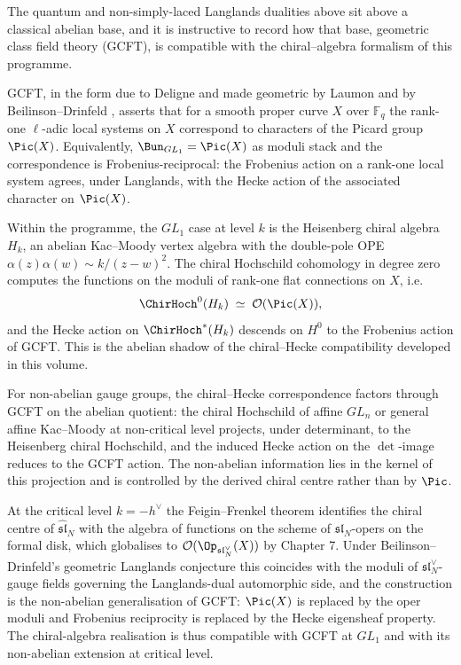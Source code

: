 \begin{remark}
\label{rem:gcft-chiral-compatibility}
The quantum and non-simply-laced Langlands dualities above sit above
a classical abelian base, and it is instructive to record how that
base, geometric class field theory (GCFT), is compatible with the
chiral--algebra formalism of this programme.

GCFT, in the form due to Deligne and made geometric by Laumon
\cite{Laumon90} and by Beilinson--Drinfeld \cite{BD04}, asserts that
for a smooth proper curve $X$ over $\mathbb{F}_q$ the rank-one
$\ell$-adic local systems on $X$ correspond to characters of the
Picard group $\Pic(X)$. Equivalently, $\Bun_{GL_1} = \Pic(X)$ as
moduli stack and the correspondence is Frobenius-reciprocal: the
Frobenius action on a rank-one local system agrees, under Langlands,
with the Hecke action of the associated character on $\Pic(X)$.

Within the programme, the $GL_1$ case at level $k$ is the Heisenberg
chiral algebra $H_k$, an abelian Kac--Moody vertex algebra with the
double-pole OPE $\alpha(z)\alpha(w)\sim k/(z-w)^2$. The chiral
Hochschild cohomology in degree zero computes the functions on the
moduli of rank-one flat connections on $X$, i.e.
\[
 \ChirHoch^0(H_k) \;\simeq\; \mathcal{O}(\Pic(X)),
\]
and the Hecke action on $\ChirHoch^*(H_k)$ descends on $H^0$ to the
Frobenius action of GCFT. This is the abelian shadow of the
chiral--Hecke compatibility developed in this volume.

For non-abelian gauge groups, the chiral--Hecke correspondence factors
through GCFT on the abelian quotient: the chiral Hochschild of affine
$GL_n$ or general affine Kac--Moody at non-critical level projects,
under determinant, to the Heisenberg chiral Hochschild, and the
induced Hecke action on the $\det$-image reduces to the GCFT action.
The non-abelian information lies in the kernel of this projection and
is controlled by the derived chiral centre rather than by $\Pic$.

At the critical level $k = -h^{\vee}$ the Feigin--Frenkel theorem
identifies the chiral centre of $\widehat{\mathfrak{sl}}_N$ with the
algebra of functions on the scheme of $\mathfrak{sl}_N$-opers on the
formal disk, which globalises to $\mathcal{O}(\Op_{\mathfrak{sl}_N^{\vee}}(X))$
by \cite{BD04} Chapter 7. Under Beilinson--Drinfeld's geometric
Langlands conjecture this coincides with the moduli of
$\mathfrak{sl}_N^{\vee}$-gauge fields governing the Langlands-dual
automorphic side, and the construction is the non-abelian
generalisation of GCFT: $\Pic(X)$ is replaced by the oper moduli and
Frobenius reciprocity is replaced by the Hecke eigensheaf property.
The chiral-algebra realisation is thus compatible with GCFT at
$GL_1$ and with its non-abelian extension at critical level.


\end{remark}
